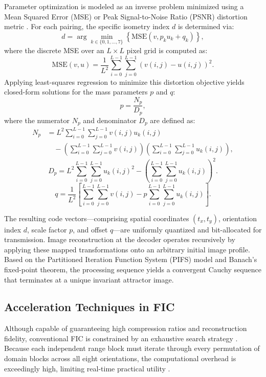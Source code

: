 \documentclass[conference]{IEEEtran}
\begin{document}
Parameter optimization is modeled as an inverse problem minimized using a Mean Squared Error (MSE) or Peak Signal-to-Noise Ratio (PSNR) distortion metric \cite{FICOriginal}. For each pairing, the specific isometry index $d$ is determined via:
\begin{equation}
d = \arg\min_{k \in \{0,1,\dots,7\}} \left\{ \text{MSE}(v, p_k u_k + q_k) \right\},
\end{equation}
where the discrete MSE over an $L \times L$ pixel grid is computed as:
\begin{equation}
\text{MSE}(v, u) = \frac{1}{L^2} \sum_{i=0}^{L-1} \sum_{j=0}^{L-1} \left( v(i,j) - u(i,j) \right)^2.
\end{equation}
Applying least-squares regression to minimize this distortion objective yields closed-form solutions for the mass parameters $p$ and $q$:
\begin{equation}
p = \frac{N_p}{D_p},
\end{equation}
where the numerator $N_p$ and denominator $D_p$ are defined as:
\begin{equation}
\begin{split}
N_p &= L^2 \sum_{i=0}^{L-1} \sum_{j=0}^{L-1} v(i,j) u_k(i,j) \\
&\quad - \left( \sum_{i=0}^{L-1} \sum_{j=0}^{L-1} v(i,j) \right) \left( \sum_{i=0}^{L-1} \sum_{j=0}^{L-1} u_k(i,j) \right),
\end{split}
\end{equation}
\begin{equation}
D_p = L^2 \sum_{i=0}^{L-1} \sum_{j=0}^{L-1} u_k(i,j)^2 - \left( \sum_{i=0}^{L-1} \sum_{j=0}^{L-1} u_k(i,j) \right)^2.
\end{equation}
\begin{equation}
q = \frac{1}{L^2} \left[ \sum_{i=0}^{L-1} \sum_{j=0}^{L-1} v(i,j) - p \sum_{i=0}^{L-1} \sum_{j=0}^{L-1} u_k(i,j) \right].
\end{equation}

The resulting code vectors—comprising spatial coordinates $(t_x, t_y)$, orientation index $d$, scale factor $p$, and offset $q$—are uniformly quantized and bit-allocated for transmission. Image reconstruction at the decoder operates recursively by applying these mapped transformations onto an arbitrary initial image profile. Based on the Partitioned Iteration Function System (PIFS) model and Banach's fixed-point theorem, the processing sequence yields a convergent Cauchy sequence that terminates at a unique invariant attractor image.

\subsection{Acceleration Techniques in FIC}
Although capable of guaranteeing high compression ratios and reconstruction fidelity, conventional FIC is constrained by an exhaustive search strategy \cite{241507}. Because each independent range block must iterate through every permutation of domain blocks across all eight orientations, the computational overhead is exceedingly high, limiting real-time practical utility \cite{241507}.
\end{document}
